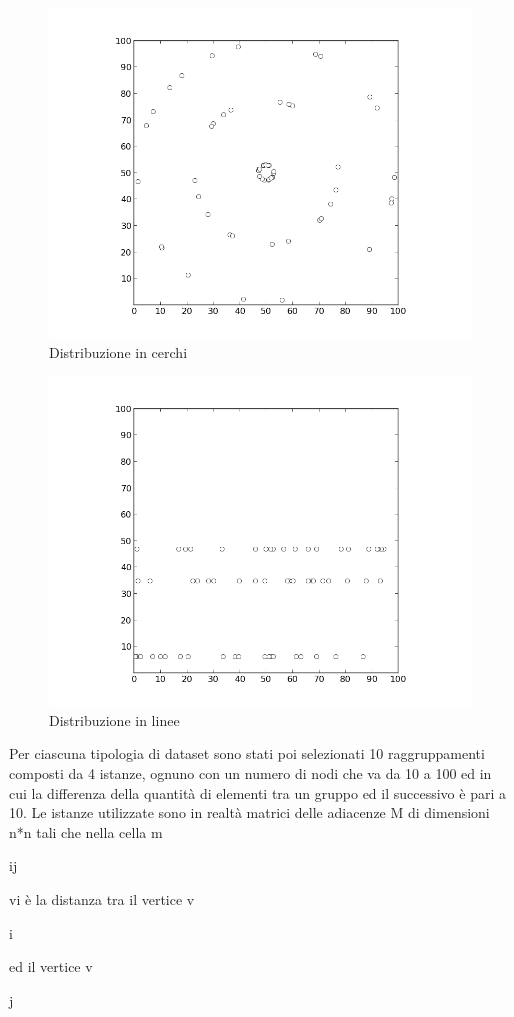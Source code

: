 \documentclass[preprint,12pt]{elsarticle}
\begin{document}
\begin{figure}[htbp]
\centering
\includegraphics[scale=0.50]{grafici_istanze/circle_60.png} 
\caption{Distribuzione in cerchi}\label{fig:3}
\end{figure}

\begin{figure}[htbp]
\centering
\includegraphics[scale=0.50]{grafici_istanze/line_60.png} 
\caption{Distribuzione in linee}\label{fig:4}
\end{figure}

Per ciascuna tipologia di dataset sono stati poi selezionati 10 raggruppamenti composti da 4 istanze, ognuno con un numero di nodi che va da 10 a 100 ed in cui la differenza della quantità di elementi tra un gruppo ed il successivo è pari a 10. Le istanze utilizzate sono in realtà matrici delle adiacenze M di dimensioni n*n tali che nella cella m\begin{tiny}ij\end{tiny} vi è la distanza tra il vertice v\begin{tiny}i\end{tiny} ed il vertice v\begin{tiny}j\end{tiny}
\end{document}
